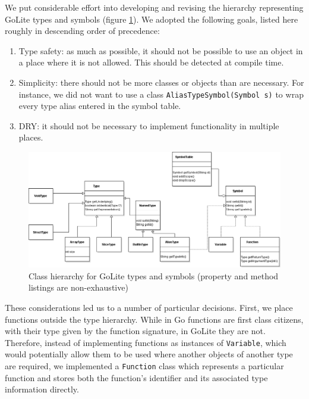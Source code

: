 \documentclass[oneside]{article}
\begin{document}
We put considerable effort into developing and revising the hierarchy representing GoLite types and symbols (figure \ref{fig:symbol_table_uml}). We adopted the following goals, listed here roughly in descending order of precedence:

\begin{enumerate}
    \item Type safety: as much as possible, it should not be possible to use an object in a place where it is not allowed. This should be detected at compile time.
    \item Simplicity: there should not be more classes or objects than are necessary. For instance, we did not want to use a class \texttt{AliasTypeSymbol(Symbol s)} to wrap every type alias entered in the symbol table.
    \item DRY: it should not be necessary to implement functionality in multiple places.
\end{enumerate}

\begin{figure}
    \includegraphics[width=\textwidth]{symbol_table_uml}
    \caption{Class hierarchy for GoLite types and symbols (property and method listings are non-exhaustive)}
    \label{fig:symbol_table_uml}
\end{figure}

These considerations led us to a number of particular decisions. First, we place functions outside the type hierarchy. While in Go functions are first class citizens, with their type given by the function signature, in GoLite they are not. Therefore, instead of implementing functions as instances of \texttt{Variable}, which would potentially allow them to be used where another objects of another type are required, we implemented a \texttt{Function} class which represents a particular function and stores both the function's identifier and its associated type information directly.
\end{document}
